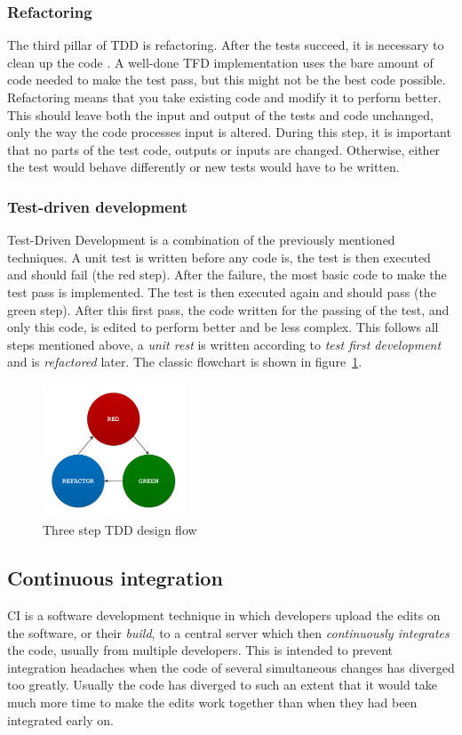 \documentclass[11pt,british]{article}
\begin{document}
\subsubsection{Refactoring}
The third pillar of TDD is refactoring. After the tests succeed, it is necessary to clean up the code \cite{refactoring}. A well-done \gls{TFD} implementation uses the bare amount of code needed to make the test pass, but this might not be the best code possible. Refactoring means that you take existing code and modify it to perform better. This should leave both the input and output of the tests and code unchanged, only the way the code processes input is altered. During this step, it is important that no parts of the test code, outputs or inputs are changed. Otherwise, either the test would behave differently or new tests would have to be written. 

\subsubsection{Test-driven development}
Test-Driven Development is a combination of the previously mentioned techniques. A unit test is written before any code is, the test is then executed and should fail (the red step). After the failure, the most basic code to make the test pass is implemented. The test is then executed again and should pass (the green step). After this first pass, the code written for the passing of the test, and only this code, is edited to perform better and be less complex. This follows all steps mentioned above, a \emph{unit rest} is written according to \emph{test first development} and is \emph{refactored} later. The classic flowchart is shown in figure~\ref{fig:TDD_Flow}.

\begin{figure}[h]
    \centering
	\includegraphics[width=0.38\textwidth]{images/tdd.pdf}
    \caption{Three step TDD design flow}
    \label{fig:TDD_Flow}
\end{figure}

\subsection{Continuous integration}
\label{subsec:CI}
\gls{CI} is a software development technique in which developers upload the edits on the software, or their \emph{build}, to a central server which then \emph{continuously integrates} the code, usually from multiple developers. This is intended to prevent integration headaches when the code of several simultaneous changes has diverged too greatly. Usually the code has diverged to such an extent that it would take much more time to make the edits work together than when they had been integrated early on.
\end{document}
